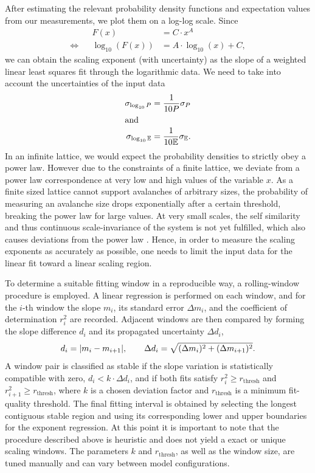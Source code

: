 After estimating the relevant probability density functions and expectation values from our measurements, we plot them on a log-log scale. Since
\begin{align}
    && F(x) &= C\cdot x^A \nonumber \\
    \iff&& \log_{10}(F(x)) &= A\cdot\log_{10}(x) + C,
\end{align}
we can obtain the scaling exponent (with uncertainty) as the slope of a weighted linear least squares fit through the logarithmic data. We need to take into account the uncertainties of the input data
\begin{align}
    \sigma_{\log_{10}P} &= \frac{1}{10P}\sigma_P \\
\intertext{and}
    \sigma_{\log_{10}\mathbb{E}} &= \frac{1}{10\mathbb{E}}\sigma_{\mathbb{E}}.
\end{align}
In an infinite lattice, we would expect the probability densities to strictly obey a power law. However due to the constraints of a finite lattice, we deviate from a power law correspondence at very low and high values of the variable $x$. As a finite sized lattice cannot support avalanches of arbitrary sizes, the probability of measuring an avalanche size drops exponentially after a certain threshold, breaking the power law for large values. At very small scales, the self similarity and thus continuous scale-invariance of the system is not yet fulfilled, which also causes deviations from the power law \cite{pruessner2012scaling}. Hence, in order to measure the scaling exponents as accurately as possible, one needs to limit the input data for the linear fit toward a linear scaling region.

To determine a suitable fitting window in a reproducible way, a rolling-window procedure is employed. A linear regression is performed on each window, and for the $i$-th window the slope $m_i$, its standard error $\Delta m_i$, and the coefficient of determination $r_i^2$ are recorded. Adjacent windows are then compared by forming the slope difference $d_i$ and its propagated uncertainty $\Delta d_i$,
\begin{equation}
    d_i = \abs{m_i-m_{i+1}}, \qquad
    \Delta d_i = \sqrt{(\Delta m_i)^2+(\Delta m_{i+1})^2}.
\end{equation}
A window pair is classified as stable if the slope variation is statistically compatible with zero, $d_i < k\cdot\Delta d_i$, and if both fits satisfy $r_i^2 \ge r_{\mathrm{thresh}}$ and $r_{i+1}^2 \ge r_{\mathrm{thresh}}$, where $k$ is a chosen deviation factor and $r_{\mathrm{thresh}}$ is a minimum fit-quality threshold. The final fitting interval is obtained by selecting the longest contiguous stable region and using its corresponding lower and upper boundaries for the exponent regression. At this point it is important to note that the procedure described above is heuristic and does not yield a exact or unique scaling windows. The parameters $k$ and $r_{\mathrm{thresh}}$, as well as the window size, are tuned manually and can vary between model configurations.

